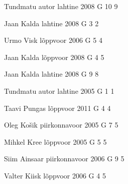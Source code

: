 \documentclass[11pt]{article}
\begin{document}
{Tundmatu autor} %
{lahtine} %
{2008} %
{G 10} %
{9} %
{

\ifEngHint
\fi
}

{Jaan Kalda} %
{lahtine} %
{2008} %
{G 3} %
{2} %
{

\ifEngHint
\fi
}

{Urmo Visk} %
{lõppvoor} %
{2006} %
{G 5} %
{4} %
{

\ifEngHint
\fi
}

{Jaan Kalda} %
{lõppvoor} %
{2008} %
{G 4} %
{5} %
{

\ifEngHint
\fi
}

{Jaan Kalda} %
{lahtine} %
{2008} %
{G 9} %
{8} %
{

\ifEngHint
\fi
}

{Tundmatu autor} %
{lahtine} %
{2005} %
{G 1} %
{1} %
{

\ifEngHint
\fi
}

{Taavi Pungas} %
{lõppvoor} %
{2011} %
{G 4} %
{4} %
{

\ifEngHint
\fi
}

{Oleg Košik} %
{piirkonnavoor} %
{2005} %
{G 7} %
{5} %
{

\ifEngHint
\fi
}

{Mihkel Kree} %
{lõppvoor} %
{2005} %
{G 5} %
{5} %
{

\ifEngHint
\fi
}

{Siim Ainsaar} %
{piirkonnavoor} %
{2006} %
{G 9} %
{5} %
{

\ifEngHint
\fi
}

{Valter Kiisk} %
{lõppvoor} %
{2006} %
{G 4} %
{5} %
{

\ifEngHint
\fi
}
\end{document}
